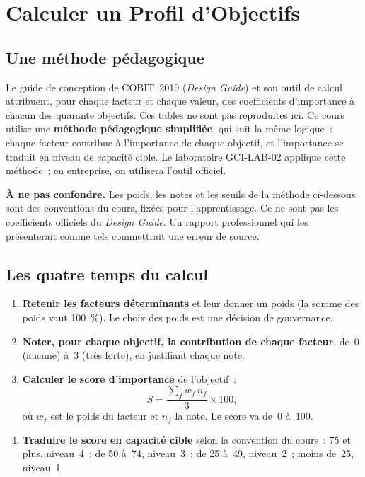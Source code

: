 \section{Calculer un Profil d'Objectifs}
\label{sec:c07-calcul}

\subsection{Une méthode pédagogique}

Le guide de conception de COBIT~2019 (\textit{Design Guide}) et son outil
de calcul attribuent, pour chaque facteur et chaque valeur, des
coefficients d'importance à chacun des quarante objectifs. Ces tables ne
sont pas reproduites ici. Ce cours utilise une \textbf{méthode
pédagogique simplifiée}, qui suit la même logique~: chaque facteur
contribue à l'importance de chaque objectif, et l'importance se traduit en
niveau de capacité cible. Le laboratoire GCI-LAB-02 applique cette méthode~;
en entreprise, on utilisera l'outil officiel.

\begin{boxalert}
\textbf{À ne pas confondre.} Les poids, les notes et les seuils de la
méthode ci-dessous sont des conventions du cours, fixées pour
l'apprentissage. Ce ne sont pas les coefficients officiels du
\textit{Design Guide}. Un rapport professionnel qui les présenterait comme
tels commettrait une erreur de source.
\end{boxalert}

\subsection{Les quatre temps du calcul}

\begin{enumerate}
    \item \textbf{Retenir les facteurs déterminants} et leur donner un poids
          (la somme des poids vaut 100~\%). Le choix des poids est une
          décision de gouvernance.
    \item \textbf{Noter, pour chaque objectif, la contribution de chaque
          facteur}, de~0 (aucune) à~3 (très forte), en justifiant chaque
          note.
    \item \textbf{Calculer le score d'importance} de l'objectif~:
          \[
              S = \frac{\sum_{f} w_f \, n_f}{3} \times 100,
          \]
          où $w_f$ est le poids du facteur et $n_f$ la note. Le score va
          de~0 à~100.
    \item \textbf{Traduire le score en capacité cible} selon la convention
          du cours~: 75 et plus, niveau~4~; de 50 à~74, niveau~3~; de 25
          à~49, niveau~2~; moins de~25, niveau~1.
\end{enumerate}

